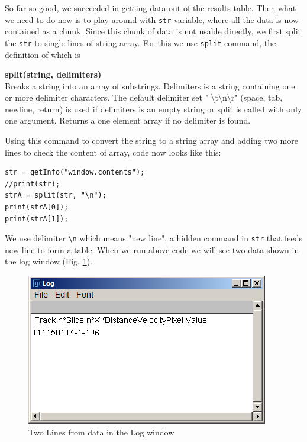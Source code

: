 \documentclass[11pt,a4paper,oneside]{report}
\newenvironment{indentCom}%
{\begin{list}{}%
         {\setlength{\leftmargin}{1em}}%
         \item[]%
}
{\end{list}}
\newcommand{\ilcom}[1]{\texttt{\small#1}}
\begin{document}
So far so good, we succeeded in getting data out of the results table. 
Then what we need to do now is to play around with \ilcom{str} variable, 
where all the data is now contained as a chunk.  Since this chunk of data is not usable directly, 
we first split the \ilcom{str} to single lines of string array. 
For this we use \ilcom{split} command, the definition of which is 

\begin{indentCom}
\textbf{split(string, delimiters)}\\
Breaks a string into an array of substrings. 
Delimiters is a string containing one or more delimiter characters. 
The default delimiter set " \textbackslash{}t\textbackslash{}n\textbackslash{}r" 
(space, tab, newline, return) is used if delimiters is an empty string or split is called with only one argument. 
Returns a one element array if no delimiter is found. 
\end{indentCom}

Using this command to convert the string to a string array and adding two more lines to check the content of array, 
code now looks like this:\\
\begin{lstlisting}[numbers=none, morekeywords={*, split}]
str = getInfo("window.contents");
//print(str);
strA = split(str, "\n");
print(strA[0]);
print(strA[1]);
\end{lstlisting}
We use delimiter \ilcom{\textbackslash{}n} which means "new line", a hidden command in \ilcom{str} 
that feeds new line to form a table. When we run above code we will see two data shown in the log window (Fig. \ref{fig:splittedLine}).
\begin{figure}[htbp]
\begin{center}
\includegraphics[scale=0.6]{fig/fig253_ZeroAndfirstlineValues.png}
\caption{Two Lines from data in the Log window}
\label{fig:splittedLine}
\end{center}
\end{figure}
\end{document}
